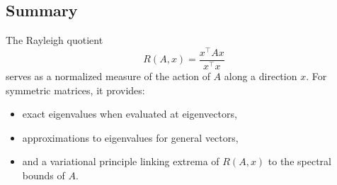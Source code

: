 \documentclass[11pt]{article}
\begin{document}
\subsection{Summary}
The Rayleigh quotient
\begin{equation}
R(A,x) = \frac{x^\top A x}{x^\top x}
\end{equation}
serves as a normalized measure of the action of $A$ along a direction $x$. For symmetric matrices, it provides:
\begin{itemize}
    \item exact eigenvalues when evaluated at eigenvectors,
    \item approximations to eigenvalues for general vectors,
    \item and a variational principle linking extrema of $R(A,x)$ to the spectral bounds of $A$.
\end{itemize}
\end{document}
